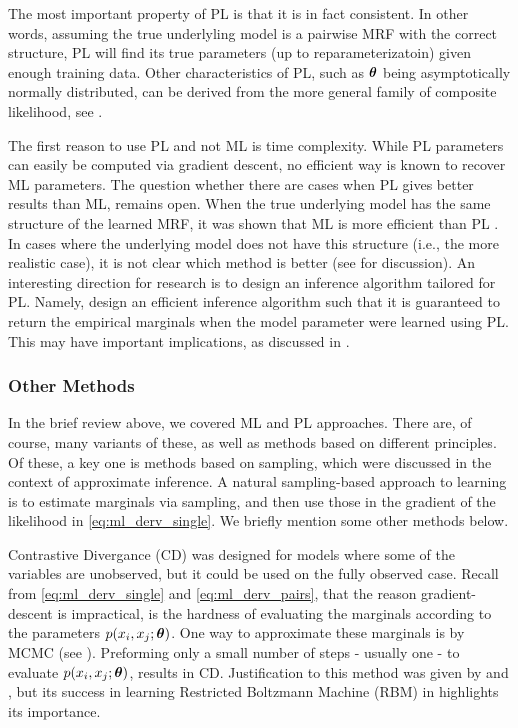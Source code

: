 The most important property of PL is that it is in fact consistent. In other words, assuming the true underlyling model is a pairwise MRF with the correct structure, PL will find its true parameters (up to reparameterizatoin) given enough training data. Other characteristics of PL, such as $\boldsymbol{\theta}$ being asymptotically normally distributed, can be derived from the more general family of composite likelihood, see \cite{varin2011overview}.

The first reason to use PL and not ML is time complexity.
While PL parameters can easily be computed via gradient descent, no efficient way is known to recover ML parameters.
The question whether there are cases when PL gives better results than ML, remains open.
When the true underlying model has the same structure of the learned MRF, it was shown that ML is more efficient than PL \cite{liang2008asymptotic}.
In cases where the underlying model does not have this structure (i.e., the more realistic case), it is not clear which method is better (see \cite{varin2011overview} for discussion).
An interesting direction for research is to design an inference algorithm tailored for PL.
Namely, design an efficient inference algorithm such that it is guaranteed to return the empirical marginals when the model parameter were learned using PL.
This may have important implications, as discussed in .

\subsubsection{Other Methods}
In the brief review above, we covered ML and PL approaches.
There are, of course, many variants of these, as well as methods based on different principles. Of these, a key one is methods based on sampling, which were discussed in the context of approximate inference. A natural sampling-based approach to learning is to estimate marginals via sampling, and then use those in the gradient of the likelihood in \eqref{eq:ml_derv_single}. We briefly mention some other methods below.
 
Contrastive Divergance (CD) \cite{hinton2002training} was designed for models where some of the variables are unobserved, but it could be used on the fully observed case. Recall from \eqref{eq:ml_derv_single} and \eqref{eq:ml_derv_pairs}, that the reason gradient-descent is impractical,  is the hardness of evaluating the marginals according to the parameters $p(x_i,x_j;\boldsymbol{\theta})$. 
One way to approximate these marginals is by MCMC (see ).
Preforming only a small number of steps - usually one - to evaluate $p(x_i,x_j;\boldsymbol{\theta})$, results in CD. Justification to this method was given by \cite{bengio2009justifying} and \cite{carreira2005contrastive}, but its success in learning Restricted Boltzmann Machine (RBM) in highlights its importance.

